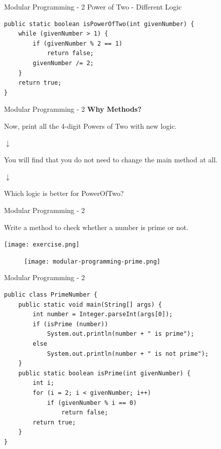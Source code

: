 \documentclass[14pt]{beamer}
\begin{document}
\begin{frame}[fragile]{Modular Programming - 2}
Power of Two - Different Logic
\begin{lstlisting}[numbers=none]
public static boolean isPowerOfTwo(int givenNumber) {
    while (givenNumber > 1) {
        if (givenNumber % 2 == 1)
            return false;
        givenNumber /= 2;
    }
    return true;
}
\end{lstlisting}
\end{frame}

\begin{frame}{Modular Programming - 2}
\small
\textbf{Why Methods?}

\vspace{1pc}
\begin{minipage}{12cm}
Now, print all the 4-digit Powers of Two with new logic.
\end{minipage}
\begin{minipage}{12cm}
\hspace{5cm}$\downarrow$
\end{minipage}
\begin{minipage}{12cm}
You will find that you do not need to change the main method at all.
\end{minipage}
\begin{minipage}{12cm}
\hspace{5cm}$\downarrow$
\end{minipage}
\begin{minipage}{12cm}
Which logic is better for PowerOfTwo?
\end{minipage}
\end{frame}

\begin{frame}[fragile]{Modular Programming - 2}
\begin{minipage}{7cm}
Write a method to check whether a number is prime or not. 
\end{minipage}
\quad
\begin{minipage}{3cm}
\texttt{[image: exercise.png]}
\end{minipage}
\begin{figure}[H]
\texttt{[image: modular-programming-prime.png]}
\end{figure}
\end{frame}

\begin{frame}[fragile]{Modular Programming - 2}
\begin{lstlisting}[numbers=none]
public class PrimeNumber {
    public static void main(String[] args) {
        int number = Integer.parseInt(args[0]);
        if (isPrime (number))
            System.out.println(number + " is prime");
        else   
            System.out.println(number + " is not prime");
    }
    public static boolean isPrime(int givenNumber) {
        int i;
        for (i = 2; i < givenNumber; i++)
            if (givenNumber % i == 0) 
                return false;
        return true;
    }
}
\end{lstlisting}
\end{frame}
\end{document}
